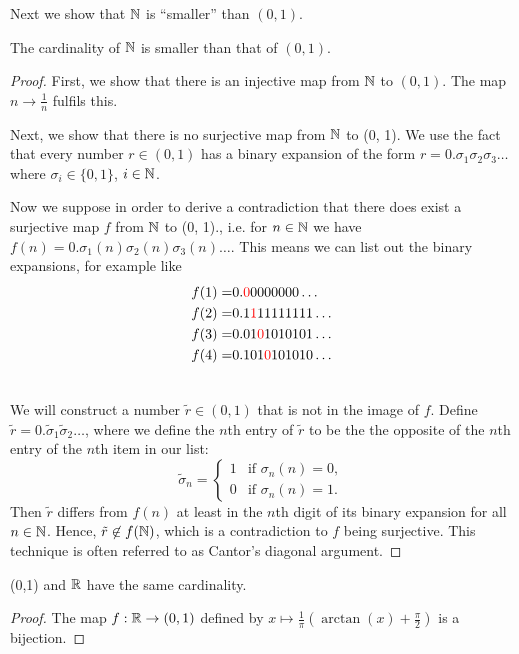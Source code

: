 \documentclass{article}
\begin{document}
Next we show that ${\mathbb{N}}$ is ``smaller'' than $(0,1)$.
\begin{theorem}
The cardinality of ${\mathbb{N}}$ is smaller than that of $(0,1)$.
\end{theorem}
\begin{proof}
First, we show that there is an injective map from ${\mathbb{N}}$ to $(0, 1)$. The map $n \to \frac{1}{n}$ fulfils this. 

Next, we show that there is no surjective map from ${\mathbb{N}}$ to (0, 1). We use the fact that every number $r \in (0,1)$ has a binary expansion of the form $r=0.\sigma_1\sigma_2\sigma_3\ldots$ where $\sigma_i \in \{0, 1\}$, $i \in {\mathbb{N}}$.

Now we suppose in order to derive a contradiction that there does exist a surjective map $f$ from ${\mathbb{N}}$ to (0, 1)., i.e. for $n \in {\mathbb{N}}$ we have $f(n) = 0.\sigma_1(n)\sigma_2(n)\sigma_3(n)\ldots$. This means we can list out the binary expansions, for example like
\begin{align*}
f(1)= & 0.\textcolor{red}{0}0000000\ldots \\
f(2)=& 0.1\textcolor{red}{1}11111111\ldots\\
f(3)=& 0.01\textcolor{red}{0}1010101\ldots  \\
f(4)= & 0.101\textcolor{red}{0}101010\ldots  \\
& 
\end{align*}

We will construct a number $\tilde r \in (0,1)$ that is not in the image of $f$. Define $\tilde r = 0.\tilde\sigma_1 \tilde\sigma_2 \ldots$, where we define the $n$th entry of $\tilde r$ to be the the opposite of the  $n$th entry of the $n$th item in our list:
\begin{equation*}
    \tilde\sigma_n = \begin{cases} 1 & \text{if } \sigma_n(n) = 0, \\
    0 & \text{if }  \sigma_n(n) = 1.
    \end{cases}
\end{equation*}
Then $\tilde r$ differs from $f(n)$ at least in the $n$th digit of its binary expansion for all $n\in {\mathbb{N}}$. Hence, $\tilde r\not\in f({\mathbb{N}})$, which is a contradiction to $f$ being surjective. This technique is often referred to as Cantor's diagonal argument. 
\end{proof}

\begin{proposition}
(0,1) and ${\mathbb{R}}$ have the same cardinality. 
\end{proposition}
\begin{proof}
The map $f:{\mathbb{R}} \to (0,1)$ defined by $x \mapsto \frac{1}{\pi} \left( \arctan(x) + \frac{\pi}{2} \right)$ is a bijection.
\end{proof}
\end{document}
